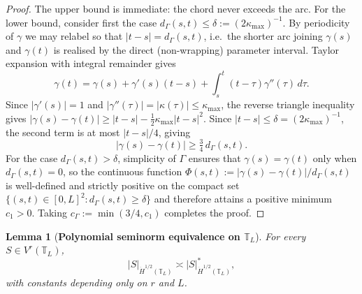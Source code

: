 \documentclass[11pt]{article}
\newtheorem{lemma}[theorem]{Lemma}
\begin{document}
\begin{proof}
The upper bound is immediate: the chord never exceeds the arc. For the
lower bound, consider first the case $d_\Gamma(s,t) \leq
\delta := (2\kappa_{\max})^{-1}$. By periodicity of $\gamma$ we may
relabel so that $|t-s| = d_\Gamma(s,t)$, i.e.\ the shorter arc joining
$\gamma(s)$ and $\gamma(t)$ is realised by the direct (non-wrapping)
parameter interval. Taylor expansion with integral remainder gives
\[
  \gamma(t) = \gamma(s) + \gamma'(s)(t-s)
  + \int_s^t (t-\tau)\gamma''(\tau)\,d\tau.
\]
Since $|\gamma'(s)|=1$ and $|\gamma''(\tau)| = |\kappa(\tau)| \leq
\kappa_{\max}$, the reverse triangle inequality gives
$|\gamma(s)-\gamma(t)| \geq |t-s| -
\tfrac{1}{2}\kappa_{\max}|t-s|^2$. Since $|t-s|\leq\delta =
(2\kappa_{\max})^{-1}$, the second term is at most $|t-s|/4$, giving
\begin{equation}\label{eq:chord_local}
  |\gamma(s)-\gamma(t)| \geq \tfrac{3}{4}\,d_\Gamma(s,t).
\end{equation}
For the case $d_\Gamma(s,t) > \delta$, simplicity of $\Gamma$ ensures
that $\gamma(s) = \gamma(t)$ only when $d_\Gamma(s,t)=0$, so the
continuous function
$\Phi(s,t) := |\gamma(s)-\gamma(t)|/d_\Gamma(s,t)$ is well-defined
and strictly positive on the compact set
$\{(s,t)\in[0,L]^2 : d_\Gamma(s,t) \geq \delta\}$ and therefore attains
a positive minimum $c_1 > 0$. Taking $c_\Gamma := \min(3/4, c_1)$
completes the proof.
\end{proof}



\begin{lemma}[\textbf{Polynomial seminorm equivalence on $\mathbb{T}_L$}]
\label{lem:poly_equiv}
For every $S \in V^r(\mathbb{T}_L)$,
\begin{equation}\label{eq:piecewise-equiv}
  |S|_{\dot{H}^{1/2}(\mathbb{T}_L)}
  \asymp |S|^*_{\dot{H}^{1/2}(\mathbb{T}_L)},
\end{equation}
with constants depending only on $r$ and $L$.
\end{lemma}
\end{document}
